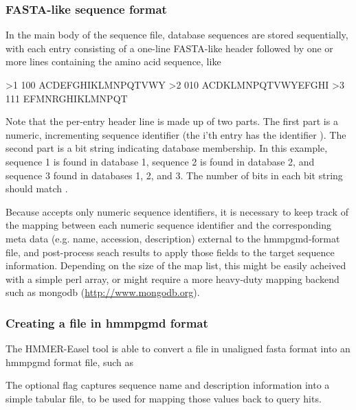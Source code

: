\subsubsection{FASTA-like sequence format}

In the main body of the sequence file, database sequences are stored
sequentially, with each entry consisting of a one-line FASTA-like
header followed by one or more lines containing the amino acid sequence, 
like

\begin{cchunk}
>1 100
ACDEFGHIKLMNPQTVWY
>2 010
ACDKLMNPQTVWYEFGHI
>3 111
EFMNRGHIKLMNPQT
\end{cchunk}

Note that the per-entry header line is made up of two parts. The first part 
is a numeric, incrementing sequence identifier (the i'th entry has the
identifier ). The second part is a bit string indicating database
membership. In this example, sequence 1 is found in database 1, sequence 2 is
found in database 2, and sequence 3 found in databases 1, 2, and 3. The number 
of bits in each bit string should match .

Because  accepts only numeric sequence identifiers, it is
necessary to keep track of the mapping between each numeric sequence identifier
and the corresponding meta data (e.g. name, accession, description) external to
the hmmpgmd-format file, and post-process  seach results to 
apply those fields to the target sequence information.
Depending on the size of the map list, this might be easily acheived with a
simple perl array, or might require a more heavy-duty mapping backend such as
mongodb (\url{http://www.mongodb.org}).
  

\subsubsection{Creating a file in hmmpgmd format}

The HMMER-Easel tool  is able to convert a file in unaligned
fasta format into an hmmpgmd format file, such as


The optional  flag captures sequence name and description
information into a simple tabular file, to be used for mapping those values 
back to  query hits.



